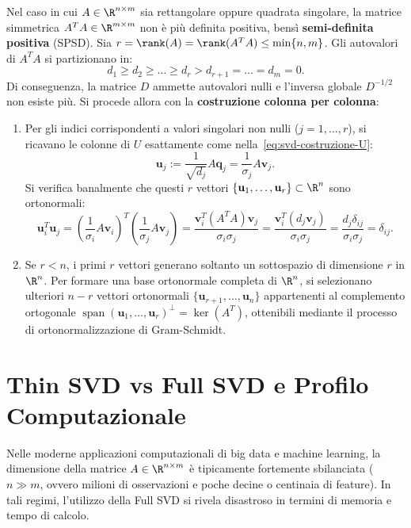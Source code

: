 Nel caso in cui $A \in \R^{n \times m}$ sia rettangolare oppure quadrata singolare, la matrice simmetrica $A^T A \in \R^{m \times m}$ non \`e pi\`u definita positiva, bens\`i \textbf{semi-definita positiva} (SPSD).
Sia $r = \rank(A) = \rank(A^T A) \le \min\{n, m\}$. Gli autovalori di $A^T A$ si partizionano in:
\begin{equation}
    d_1 \ge d_2 \ge \dots \ge d_r > d_{r+1} = \dots = d_m = 0.
\end{equation}
Di conseguenza, la matrice $D$ ammette autovalori nulli e l'inversa globale $D^{-1/2}$ non esiste pi\`u. Si procede allora con la \textbf{costruzione colonna per colonna}:
\begin{enumerate}
    \item Per gli indici corrispondenti a valori singolari non nulli ($j = 1, \dots, r$), si ricavano le colonne di $U$ esattamente come nella~\eqref{eq:svd-costruzione-U}:
    \begin{equation}
        \mathbf{u}_j := \frac{1}{\sqrt{d_j}} A \mathbf{q}_j = \frac{1}{\sigma_j} A \mathbf{v}_j.
    \end{equation}
    Si verifica banalmente che questi $r$ vettori $\{\mathbf{u}_1, \dots, \mathbf{u}_r\} \subset \R^n$ sono ortonormali:
    \begin{equation}
        \mathbf{u}_i^T \mathbf{u}_j = \left(\frac{1}{\sigma_i} A \mathbf{v}_i\right)^T \left(\frac{1}{\sigma_j} A \mathbf{v}_j\right) = \frac{\mathbf{v}_i^T (A^T A) \mathbf{v}_j}{\sigma_i \sigma_j} = \frac{\mathbf{v}_i^T (d_j \mathbf{v}_j)}{\sigma_i \sigma_j} = \frac{d_j \delta_{ij}}{\sigma_i \sigma_j} = \delta_{ij}.
    \end{equation}
    \item Se $r < n$, i primi $r$ vettori generano soltanto un sottospazio di dimensione $r$ in $\R^n$. Per formare una base ortonormale completa di $\R^n$, si selezionano ulteriori $n - r$ vettori ortonormali $\{\mathbf{u}_{r+1}, \dots, \mathbf{u}_n\}$ appartenenti al complemento ortogonale $\operatorname{span}(\mathbf{u}_1, \dots, \mathbf{u}_r)^\perp = \ker(A^T)$, ottenibili mediante il processo di ortonormalizzazione di Gram-Schmidt.
\end{enumerate}

\FloatBarrier
\section{Thin SVD vs Full SVD e Profilo Computazionale}
\label{sec:svd-thin-vs-full}

Nelle moderne applicazioni computazionali di big data e machine learning, la dimensione della matrice $A \in \R^{n \times m}$ \`e tipicamente fortemente sbilanciata ($n \gg m$, ovvero milioni di osservazioni e poche decine o centinaia di feature). In tali regimi, l'utilizzo della Full SVD si rivela disastroso in termini di memoria e tempo di calcolo.

